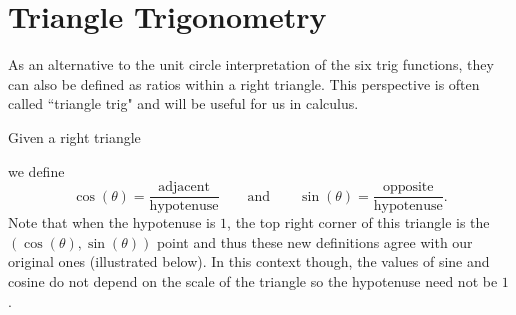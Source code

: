\documentclass{ximera}
\begin{document}
\section{Triangle Trigonometry}

As an alternative to the unit circle interpretation of the six trig functions, they can also be defined as ratios within a right triangle. This perspective is often called ``triangle trig" and will be useful for us in calculus.
    
    
Given a right triangle
\begin{image}[2in]
\end{image}
we define
\[
\cos(\theta) =
\frac{\text{adjacent}}{\text{hypotenuse}}\qquad\text{and}\qquad\sin(\theta)
= \frac{\text{opposite}}{\text{hypotenuse}}.
\]
Note that when the hypotenuse is $1$, the top right corner of this triangle is the $(\cos(\theta),\sin(\theta))$ point and thus these new definitions agree with our original ones (illustrated below). In this context though, the values of sine and cosine do not depend on the scale of the
triangle so the hypotenuse need not be $1$. %

%      
%      
\end{document}
